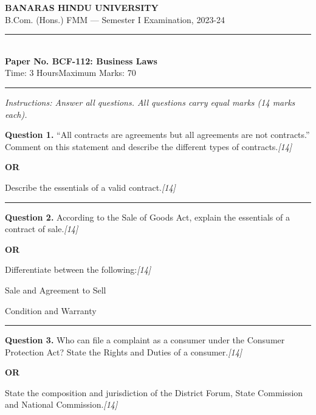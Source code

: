 \documentclass[11pt,a4paper]{article}
\newcommand{\pts}[1]{\hfill   \textit{[#1]}}
\begin{document}
\begin{center}
  {\large\bfseries BANARAS HINDU UNIVERSITY}\\[2pt]
  {\normalsize B.Com. (Hons.) FMM --- Semester I Examination, 2023-24}\\[6pt]
  \rule{0.8\linewidth}{0.5pt}\\[6pt]
  {\large\bfseries Paper No. BCF-112: Business Laws}\\[4pt]
  {\normalsize Time: 3 Hours\hfill Maximum Marks: 70}
\end{center}

\rule{\linewidth}{0.4pt}

\smallskip



\noindent   \textit{Instructions: Answer all questions. All questions carry equal marks (14 marks each).}

\bigskip




\noindent   \textbf{Question 1.}
``All contracts are agreements but all agreements are not contracts.'' Comment on this statement and describe the different types of contracts.\pts{14}

\centerline{   \textbf{OR}}

Describe the essentials of a valid contract.\pts{14}

\medskip\rule{\linewidth}{0.2pt}




\noindent   \textbf{Question 2.}
According to the Sale of Goods Act, explain the essentials of a contract of sale.\pts{14}

\centerline{   \textbf{OR}}

Differentiate between the following:\pts{14}

\begin{parts}
  \item Sale and Agreement to Sell
  \item Condition and Warranty
\end{parts}

\medskip\rule{\linewidth}{0.2pt}




\noindent   \textbf{Question 3.}
Who can file a complaint as a consumer under the Consumer Protection Act? State the Rights and Duties of a consumer.\pts{14}

\centerline{   \textbf{OR}}

State the composition and jurisdiction of the District Forum, State Commission and National Commission.\pts{14}
\end{document}
